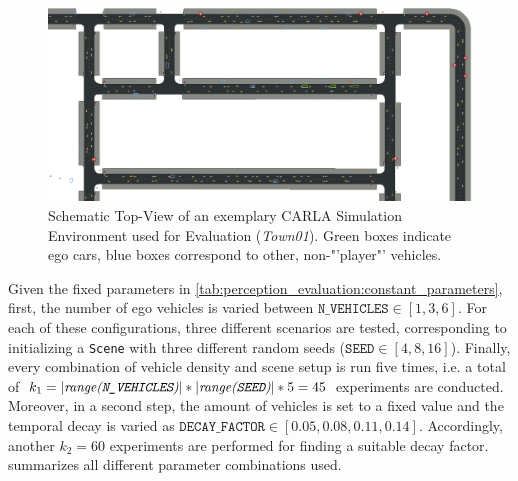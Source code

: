 \begin{figure}
	\centering
	\includegraphics[width=1\linewidth]{98_images/evaluation_scene_topview_cropped}
	\caption[Schematic Top-View of the Simulation Environment used for Evaluation]{Schematic Top-View of an exemplary CARLA Simulation Environment used for Evaluation (\textit{Town01}). Green boxes indicate ego cars, blue boxes correspond to other, non-"'player"' vehicles.}
	\label{fig:carla_scene_topview}
\end{figure}

Given the fixed parameters in \cref{tab:perception_evaluation:constant_parameters}, first, the number of ego vehicles is varied between $\texttt{N\_VEHICLES} \in [1, 3, 6]$. For each of these configurations, three different scenarios are tested, corresponding to initializing a \texttt{Scene} with three different random seeds ($\texttt{SEED} \in [4, 8, 16]$). Finally, every combination of vehicle density and scene setup is run five times, i.e. a total of $k_1 = |\textit{range(\texttt{N\_VEHICLES})}| * |\textit{range(\texttt{SEED})}| * 5 = 45$ experiments are conducted. Moreover, in a second step, the amount of vehicles is set to a fixed value and the temporal decay is varied as $\texttt{DECAY\_FACTOR} \in [0.05, 0.08, 0.11, 0.14]$. Accordingly, another $k_2 = 60$ experiments are performed for finding a suitable decay factor.  summarizes all different parameter combinations used.

